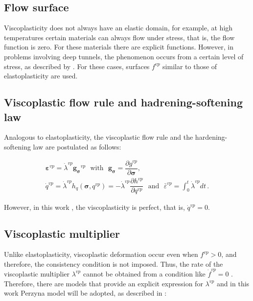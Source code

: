 \documentclass[Journal,letterpaper]{ascelike-new}
\newcommand{\hl}{{h_q}}
\newcommand{\strainvp}{\boldsymbol{\varepsilon}^{vp}}
\newcommand{\strainvpeq}{\bar \varepsilon^{vp}}
\newcommand{\dgds}{\boldsymbol{g_\sigma}}
\newcommand{\stress}{\boldsymbol{\sigma}}
\begin{document}
\subsection{Flow surface}

Viscoplasticity does not always have an elastic domain, for example, at high temperatures certain materials can always flow under stress, that is, the flow function is zero. For these materials there are explicit functions. However, in problems involving deep tunnels, the phenomenon occurs from a certain level of stress, as described by . For these cases, surfaces $f^{vp}$ similar to those of elastoplasticity are used.

\subsection{Viscoplastic flow rule and hadrening-softening law}

Analogous to elastoplasticity, the viscoplastic flow rule and the hardening-softening law are postulated as follows:

\begin{equation} \label{eq_plastic_flow_rule}
	\begin{array}{lcl}
		\strainvp = \dot \lambda^{vp} \dgds^{vp} ~~~ \text{with} ~~~ \dgds = \dfrac{\partial g^{vp}}{\partial \stress}, \\ 
		\dot q^{vp} = \dot \lambda^{vp} \hl(\stress,q^{vp}) = - \dot \lambda^{vp} \dfrac{\partial h^{vp}}{\partial q^{vp}} ~~~\text{and} ~~~ \strainvpeq = \int_{0}^{t} \dot \lambda^{vp} dt  \,.
	\end{array}
\end{equation}

However, in this work , the viscoplasticity is perfect, that is, $\dot q^{vp} = 0$.

\subsection{Viscoplastic multiplier}

Unlike elastoplasticity, viscoplastic deformation occur even when $f^{vp} > 0$, and therefore, the consistency condition is not imposed. Thus, the rate of the viscoplastic multiplier $\lambda^{vp}$ cannot be obtained from a condition like $\dot f^{vp} = 0$ . Therefore, there are models that provide an explicit expression for $\lambda^{vp}$ and in this work Perzyna model \cite{perzyna1966} will be adopted, as described in :
\end{document}
